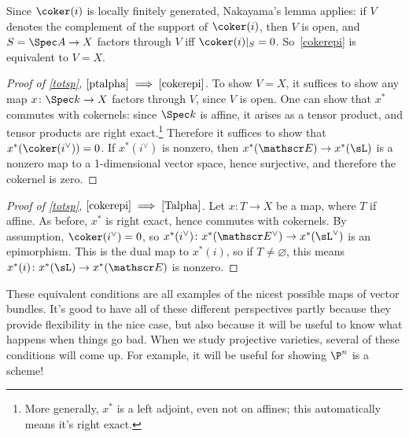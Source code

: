 Since $\coker(i)$ is locally finitely generated, Nakayama's lemma applies: if $V$ denotes the complement of the
support of $\coker(i)$, then $V$ is open, and $S = \Spec A\to X$ factors through $V$ iff $\coker(i)|_S = 0$.
So~\eqref{cokerepi} is equivalent to $V = X$.
\begin{proof}[Proof of \cref{totsp}, $\eqref{ptalpha}\implies\eqref{cokerepi}$]
To show $V = X$, it suffices to show any map $x\colon \Spec k\to X$ factors through $V$, since $V$ is open. One can
show that $x^*$ commutes with cokernels: since $\Spec k$ is affine, it arises as a tensor product, and tensor
products are right exact.\footnote{More generally, $x^*$ is a left adjoint, even not on affines; this automatically
means it's right exact.} Therefore it suffices to show that $x^*(\coker(i^\vee)) = 0$. If $x^*(i^\vee)$ is nonzero,
then $x^*(\sE)\to x^*(\sL)$ is a nonzero map to a 1-dimensional vector space, hence surjective, and therefore the
cokernel is zero.
\end{proof}
\begin{proof}[Proof of \cref{totsp}, $\eqref{cokerepi} \implies\eqref{Talpha}$]
Let $x\colon T\to X$ be a map, where $T$ if affine. As before, $x^*$ is right exact, hence commutes with cokernels.
By assumption, $\coker(i^\vee) = 0$, so $x^*(i^\vee)\colon x^*(\sE^\vee)\to x^*(\sL^\vee)$ is an epimorphism. This
is the dual map to $x^*(i)$, so if $T\ne\varnothing$, this means $x^*(i)\colon x^*(\sL)\to x^*(\sE)$ is nonzero.
\end{proof}
These equivalent conditions are all examples of the nicest possible maps of vector bundles. It's good to have all
of these different perspectives partly because they provide flexibility in the nice case, but also because it will
be useful to know what happens when things go bad. When we study projective varieties, several of these conditions
will come up. For example, it will be useful for showing $\P^n$ is a scheme!
